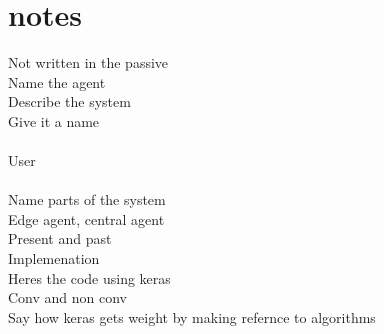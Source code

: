 \documentclass[12pt]{article}
\begin{document}
\section{notes}
Not written in the passive\\
	Name the agent\\
	Describe the system\\
		Give it a name\\\\
		User\\\\
		Name parts of the system\\ 
		Edge agent, central agent\\
Present and past\\
Implemenation\\
Heres the code using keras
\\Conv and non conv
\\Say how keras gets weight by making refernce to algorithms
\\\\
\clearpage
\printbibliography[title={Bibliography}]
\end{document}

